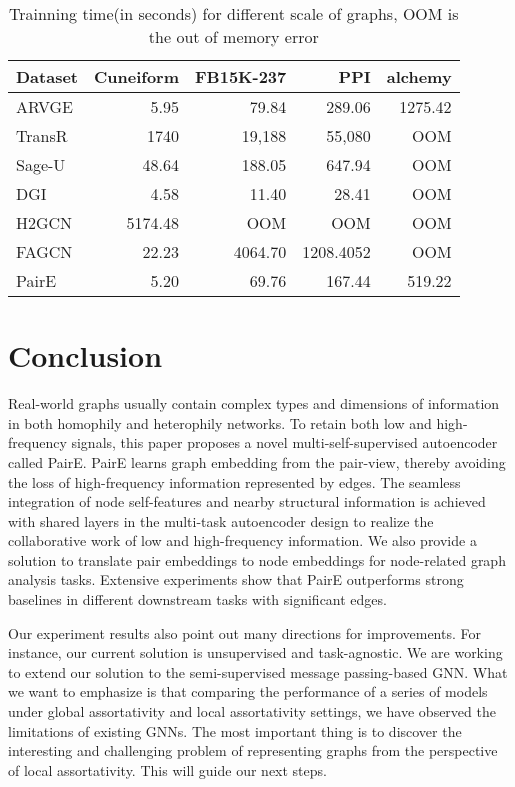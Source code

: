 \documentclass[10pt,journal,compsoc]{IEEEtran}
\begin{document}
  \begin{table}[htbp]
 \centering
  \caption{Trainning time(in seconds) for different scale of graphs, OOM is the out of memory error}
\begin{tabular}{lrrrr}
    \toprule
    \textbf{Dataset} &  Cuneiform & FB15K-237 & PPI  & alchemy\\
    \midrule
    ARVGE    & 5.95  & 79.84  & 289.06 & 1275.42 \\
    TransR  & 1740 & 19,188 & 55,080 & OOM  \\
    Sage-U    &  48.64  & 188.05  &  647.94 & OOM \\
    DGI & 4.58  & 11.40  & 28.41 &  OOM \\
    H2GCN &5174.48 &OOM & OOM &OOM \\
    FAGCN & 22.23&4064.70 & 1208.4052& OOM\\
    PairE & 5.20& 69.76& 167.44& 519.22\\
    \bottomrule
    \end{tabular}
  \label{tab:time}
\end{table}



\section{Conclusion}
\label{sec:conclusion}
Real-world graphs usually contain complex types and dimensions of information in both homophily and heterophily networks. To retain both low and high-frequency signals, this paper proposes a novel multi-self-supervised autoencoder called PairE. PairE learns graph embedding from the pair-view, thereby avoiding the loss of high-frequency information represented by edges. The seamless integration of node self-features and nearby structural information is achieved with shared layers in the multi-task autoencoder design to realize the collaborative work of low and high-frequency information. We also provide a solution to translate pair embeddings to node embeddings for node-related graph analysis tasks. Extensive experiments show that PairE outperforms strong baselines in different downstream tasks with significant edges. 

Our experiment results also point out many directions for improvements. For instance, our current solution is unsupervised and task-agnostic. We are working to extend our solution to the semi-supervised message passing-based GNN.  What we want to emphasize is that comparing the performance of a series of models under global assortativity and local assortativity settings, we have observed the limitations of existing GNNs. The most important thing is to discover the interesting and challenging problem of representing graphs from the perspective of local assortativity. This will guide our next steps. 
\end{document}
